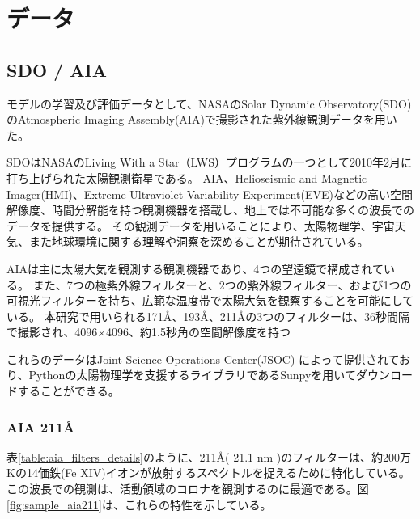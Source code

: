 \chapter{データ} 

\section{SDO / AIA}
モデルの学習及び評価データとして、NASAのSolar Dynamic Observatory(SDO)\cite{pesnell2012solar}のAtmospheric Imaging Assembly(AIA)\cite{lemen2012atmospheric}で撮影された紫外線観測データを用いた。

SDOはNASAのLiving With a Star（LWS）プログラムの一つとして2010年2月に打ち上げられた太陽観測衛星である。
AIA、Helioseismic and Magnetic Imager(HMI)、Extreme Ultraviolet Variability Experiment(EVE)などの高い空間解像度、時間分解能を持つ観測機器を搭載し、地上では不可能な多くの波長でのデータを提供する。
その観測データを用いることにより、太陽物理学、宇宙天気、また地球環境に関する理解や洞察を深めることが期待されている。

AIAは主に太陽大気を観測する観測機器であり、4つの望遠鏡で構成されている。
また、7つの極紫外線フィルターと、2つの紫外線フィルター、および1つの可視光フィルターを持ち、広範な温度帯で太陽大気を観察することを可能にしている。
本研究で用いられる171Å、193Å、211Åの3つのフィルターは、36秒間隔で撮影され、4096×4096、約1.5秒角の空間解像度を持つ

これらのデータはJoint Science Operations Center(JSOC) によって提供されており、Pythonの太陽物理学を支援するライブラリであるSunpyを用いてダウンロードすることができる。


\subsection{AIA 211Å}
    表\ref{table:aia_filters_details}のように、211Å( 21.1 nm )のフィルターは、約200万Kの14価鉄(Fe XIV)イオンが放射するスペクトルを捉えるために特化している。
    この波長での観測は、活動領域のコロナを観測するのに最適である。図\ref{fig:sample_aia211}は、これらの特性を示している。

